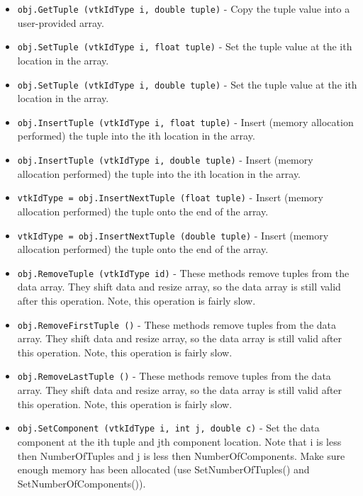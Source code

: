 \begin{itemize}
\item  \verb|obj.GetTuple (vtkIdType i, double tuple)| -  Copy the tuple value into a user-provided array.

\item  \verb|obj.SetTuple (vtkIdType i, float tuple)| -  Set the tuple value at the ith location in the array.

\item  \verb|obj.SetTuple (vtkIdType i, double tuple)| -  Set the tuple value at the ith location in the array.

\item  \verb|obj.InsertTuple (vtkIdType i, float tuple)| -  Insert (memory allocation performed) the tuple into the ith location
 in the array.

\item  \verb|obj.InsertTuple (vtkIdType i, double tuple)| -  Insert (memory allocation performed) the tuple into the ith location
 in the array.

\item  \verb|vtkIdType = obj.InsertNextTuple (float tuple)| -  Insert (memory allocation performed) the tuple onto the end of the array.

\item  \verb|vtkIdType = obj.InsertNextTuple (double tuple)| -  Insert (memory allocation performed) the tuple onto the end of the array.

\item  \verb|obj.RemoveTuple (vtkIdType id)| -  These methods remove tuples from the data array. They shift data and
 resize array, so the data array is still valid after this operation. Note,
 this operation is fairly slow.

\item  \verb|obj.RemoveFirstTuple ()| -  These methods remove tuples from the data array. They shift data and
 resize array, so the data array is still valid after this operation. Note,
 this operation is fairly slow.

\item  \verb|obj.RemoveLastTuple ()| -  These methods remove tuples from the data array. They shift data and
 resize array, so the data array is still valid after this operation. Note,
 this operation is fairly slow.

\item  \verb|obj.SetComponent (vtkIdType i, int j, double c)| -  Set the data component at the ith tuple and jth component location.
 Note that i is less then NumberOfTuples and j is less then 
 NumberOfComponents. Make sure enough memory has been allocated (use 
 SetNumberOfTuples() and  SetNumberOfComponents()).


\end{itemize}
